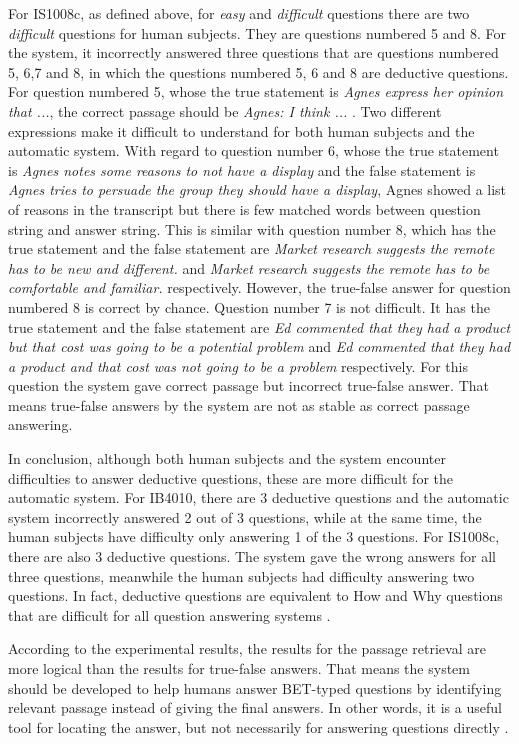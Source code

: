 For IS1008c, as defined above, for \textit{easy} and \textit{difficult} questions there are two \textit{difficult} questions for human subjects. They are questions numbered 5 and 8. For the system, it incorrectly answered three questions that are questions numbered 5, 6,7 and 8, in which the questions numbered 5, 6 and 8 are deductive questions. For question numbered 5, whose the true statement is \textit{Agnes express her opinion that ...}, the correct passage should be \textit{Agnes: I think ... }. Two different expressions make it difficult to understand for both human subjects and the automatic system. With regard to question number 6, whose the true statement is \textit{Agnes notes some reasons to not have a display} and the false statement is \textit{Agnes tries to persuade the group they should have a display}, Agnes showed a list of reasons in the transcript but there is few matched words between question string and answer string. This is similar with question number 8, which has the true statement and the false statement are \textit{Market research suggests the remote has to be new and different.} and \textit{Market research suggests the remote has to be comfortable and familiar.} respectively. However, the true-false answer for question numbered 8 is correct by chance. Question number 7 is not difficult. It has the true statement and the false statement are \textit{Ed commented that they had a product but that cost was going to be a potential problem} and \textit{Ed commented that they had a product and that cost was not going to be a problem} respectively. For this question the system gave correct passage but incorrect true-false answer. That means true-false answers by the system are not as stable as correct passage answering.

In conclusion, although both human subjects and the system encounter difficulties to answer deductive questions, these are more difficult for the automatic system. For IB4010, there are 3 deductive questions and the automatic system incorrectly answered 2 out of 3 questions, while at the same time, the human subjects have difficulty only answering 1 of the 3 questions. For IS1008c, there are also 3 deductive questions. The system gave the wrong answers for all three questions, meanwhile the human subjects had difficulty answering two questions. In fact, deductive questions are equivalent to How and Why questions that are difficult for all question answering systems \cite{prager2000qap, brill2002diq}.

According to the experimental results, the results for the passage retrieval are more logical than the results for true-false answers. That means the system should be developed to help humans answer BET-typed questions by identifying relevant passage instead of giving the final answers. In other words, it is a useful tool for locating the answer, but not necessarily for answering questions directly \cite{lequocanh1}.
 

\newpage




